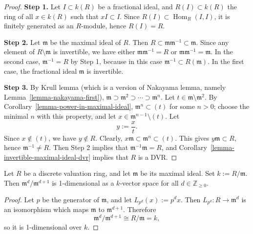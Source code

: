 \begin{proof}
\textbf{Step 1.} Let $I\subset k(R)$ be a
fractional ideal, and $R(I)\subset k(R)$ the
ring of all $x\in k(R)$ such that $xI\subset I$.
Since $R(I)\subset \operatorname{Hom}_R(I, I)$,
it is finitely generated as an $R$-module,
hence $R(I)=R$.

\textbf{Step 2.} Let $\mathfrak{m}$ be the
maximal ideal of $R$. Then
$R\subset \mathfrak{m}\mathfrak{m}^{-1}\subset
\mathfrak{m}$. Since any element of
$R\setminus \mathfrak{m}$ is invertible, we
have either $\mathfrak{m}\mathfrak{m}^{-1}=R$
or $\mathfrak{m}\mathfrak{m}^{-1}=\mathfrak{m}$.
In the second case,
$\mathfrak{m}^{-1}=R$ by Step 1, because in
this case $\mathfrak{m}^{-1}\subset R(\mathfrak{m})$.
In the first case, the fractional ideal
$\mathfrak{m}$ is invertible.

\textbf{Step 3.} By Krull lemma
(which is a version
of Nakayama lemma, 
namely Lemma~\ref{lemma-nakayama-first}),
$\mathfrak{m}\supset \mathfrak{m}^2\supset
\cdots \supset \mathfrak{m}^n$.
Let $t\in \mathfrak{m}\setminus \mathfrak{m}^2$.
By Corollary~\ref{lemma-power-in-maximal-ideal},
$\mathfrak{m}^n\subset (t)$ for some $n>0$;
choose the minimal $n$ with this property, and
let $x\in \mathfrak{m}^{n-1}\setminus (t)$.
Let
$$
y:=\frac{x}{t}.
$$
Since $x\notin (t)$, we have $y\notin R$.
Clearly, $x\mathfrak{m}\subset \mathfrak{m}^n
\subset (t)$. This gives
$y\mathfrak{m}\subset R$, hence
$\mathfrak{m}^{-1}\neq R$. Then Step 2 implies
that $\mathfrak{m}^{-1}\mathfrak{m}=R$, and
Corollary~\ref{lemma-invertible-maximal-ideal-dvr}
implies that $R$ is a DVR.
\end{proof}

\begin{lemma}
\label{lemma-dvr-quotient-powers}
Let $R$ be a discrete valuation ring, and let
$\mathfrak{m}$ be its maximal ideal. Set
$k:=R/\mathfrak{m}$. Then
$\mathfrak{m}^d/\mathfrak{m}^{d+1}$ is
1-dimensional as a $k$-vector space for all
$d\in \mathbb{Z}_{\geq 0}$.
\end{lemma}

\begin{proof}
Let $p$ be the generator of $\mathfrak{m}$,
and let $L_{p^d}(x):=p^d x$. Then
$L_{p^d}:R\to \mathfrak{m}^d$ is an isomorphism
which maps $\mathfrak{m}$ to $\mathfrak{m}^{d+1}$.
Therefore
$$
\mathfrak{m}^d/\mathfrak{m}^{d+1}\cong R/\mathfrak{m}=k,
$$
so it is 1-dimensional over $k$.
\end{proof}


